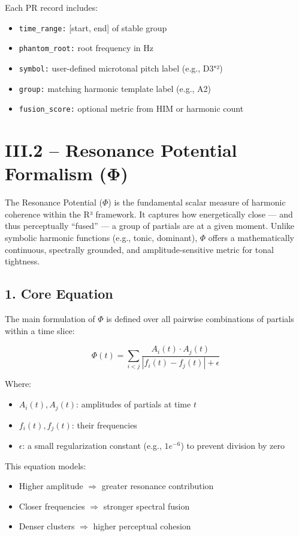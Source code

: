Each PR record includes:

\begin{itemize}
    \item \texttt{time\_range:} [start, end] of stable group
    \item \texttt{phantom\_root:} root frequency in Hz
    \item \texttt{symbol:} user-defined microtonal pitch label (e.g., D3⁺²)
    \item \texttt{group:} matching harmonic template label (e.g., A2)
    \item \texttt{fusion\_score:} optional metric from HIM or harmonic count
\end{itemize}

\section*{III.2 – Resonance Potential Formalism (Φ)}

The Resonance Potential ($\Phi$) is the fundamental scalar measure of harmonic coherence within the R³ framework. It captures how energetically close — and thus perceptually “fused” — a group of partials are at a given moment. Unlike symbolic harmonic functions (e.g., tonic, dominant), $\Phi$ offers a mathematically continuous, spectrally grounded, and amplitude-sensitive metric for tonal tightness.

\subsection*{1. Core Equation}

The main formulation of $\Phi$ is defined over all pairwise combinations of partials within a time slice:

\[
\Phi(t) = \sum_{i<j} \frac{A_i(t) \cdot A_j(t)}{|f_i(t) - f_j(t)| + \epsilon}
\]

Where:

\begin{itemize}
    \item $A_i(t), A_j(t)$: amplitudes of partials at time $t$
    \item $f_i(t), f_j(t)$: their frequencies
    \item $\epsilon$: a small regularization constant (e.g., $1e^{-6}$) to prevent division by zero
\end{itemize}

This equation models:

\begin{itemize}
    \item Higher amplitude $\Rightarrow$ greater resonance contribution
    \item Closer frequencies $\Rightarrow$ stronger spectral fusion
    \item Denser clusters $\Rightarrow$ higher perceptual cohesion
\end{itemize}

